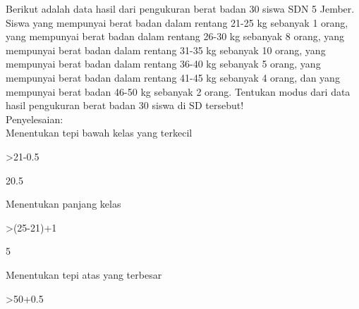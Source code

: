 \documentclass[12pt,arial,letterpaper]{book}
\begin{document}
\begin{eulercomment}
\begin{eulercomment}
\begin{eulercomment}
\begin{eulercomment}
\begin{eulercomment}
\begin{eulercomment}
\begin{eulercomment}
\begin{eulercomment}
\begin{eulercomment}
\begin{eulercomment}
\begin{eulercomment}
\begin{eulercomment}
\begin{eulercomment}
\begin{eulercomment}
\begin{eulercomment}
\begin{eulercomment}
\begin{eulercomment}
\begin{eulercomment}
\begin{eulercomment}
\begin{eulercomment}
\begin{eulercomment}
\begin{eulercomment}
\begin{eulercomment}
\begin{eulercomment}
\begin{eulercomment}
\begin{eulercomment}
\begin{eulercomment}
\begin{eulercomment}
\begin{eulercomment}
\begin{eulercomment}
\begin{eulercomment}
\begin{eulercomment}
\begin{eulercomment}
\begin{eulercomment}
\begin{eulercomment}
\begin{eulercomment}
\begin{eulercomment}
\begin{eulercomment}
\begin{eulercomment}
\end{eulercomment}
\begin{eulercomment}
Berikut adalah data hasil dari pengukuran berat badan 30 siswa SDN 5
Jember. Siswa yang mempunyai berat badan dalam rentang 21-25 kg
sebanyak 1 orang, yang mempunyai berat badan dalam rentang 26-30 kg
sebanyak 8 orang, yang mempunyai berat badan dalam rentang 31-35 kg
sebanyak 10 orang, yang mempunyai berat badan dalam rentang 36-40 kg
sebanyak 5 orang, yang mempunyai berat badan dalam rentang 41-45 kg
sebanyak 4 orang, dan yang mempunyai berat badan 46-50 kg sebanyak 2
orang. Tentukan modus dari data hasil pengukuran berat badan 30 siswa
di SD tersebut!\\
Penyelesaian:\\
Menentukan tepi bawah kelas yang terkecil
\end{eulercomment}
\begin{eulerprompt}
>21-0.5
\end{eulerprompt}
\begin{euleroutput}
  20.5
\end{euleroutput}
\begin{eulercomment}
Menentukan panjang kelas
\end{eulercomment}
\begin{eulerprompt}
>(25-21)+1
\end{eulerprompt}
\begin{euleroutput}
  5
\end{euleroutput}
\begin{eulercomment}
Menentukan tepi atas yang terbesar
\end{eulercomment}
\begin{eulerprompt}
>50+0.5
\end{eulerprompt}

\end{eulercomment}
\end{eulercomment}
\end{eulercomment}
\end{eulercomment}
\end{eulercomment}
\end{eulercomment}
\end{eulercomment}
\end{eulercomment}
\end{eulercomment}
\end{eulercomment}
\end{eulercomment}
\end{eulercomment}
\end{eulercomment}
\end{eulercomment}
\end{eulercomment}
\end{eulercomment}
\end{eulercomment}
\end{eulercomment}
\end{eulercomment}
\end{eulercomment}
\end{eulercomment}
\end{eulercomment}
\end{eulercomment}
\end{eulercomment}
\end{eulercomment}
\end{eulercomment}
\end{eulercomment}
\end{eulercomment}
\end{eulercomment}
\end{eulercomment}
\end{eulercomment}
\end{eulercomment}
\end{eulercomment}
\end{eulercomment}
\end{eulercomment}
\end{eulercomment}
\end{eulercomment}
\end{eulercomment}
\end{document}
